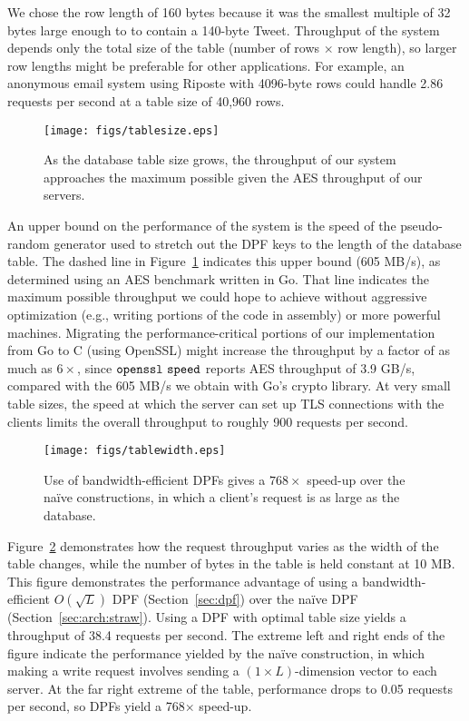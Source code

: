 \documentclass[10pt,twocolumn]{article}
\newcommand{\name}{Riposte\xspace}
\begin{document}
We chose the row length of 160 bytes because it was the smallest
multiple of 32 bytes large enough to to contain a 140-byte Tweet.
Throughput of the system depends only the total
size of the table (number of rows $\times$ row length), so larger
row lengths might be preferable for other applications.
For example, an anonymous email system using \name with 
4096-byte rows could handle 2.86 requests per second at a table
size of 40,960 rows.

\begin{figure}
\centering
\texttt{[image: figs/tablesize.eps]}
\caption{As the database table size grows, the throughput of
  our system approaches the maximum possible given the 
  AES throughput of our servers.}
\label{fig:tablesize}
\end{figure}

An upper bound on the performance of the system is the speed 
of the pseudo-random generator used to stretch out the
DPF keys to the length of the database table.
The dashed line in Figure~\ref{fig:tablesize} indicates this upper
bound (605 MB/s), as determined using an AES benchmark written in Go.
That line indicates the maximum possible throughput we could hope
to achieve without aggressive optimization (e.g., writing portions of
the code in assembly) or more powerful machines.
Migrating the performance-critical
portions of our implementation from Go to C (using OpenSSL)
might increase the throughput by a factor of as much as
$6\times$, since ${\tt openssl\ speed}$ reports AES throughput of 3.9 GB/s,
compared with the 605 MB/s we obtain with Go's crypto library.
At very small table sizes, the speed at which the server can set up
TLS connections with the clients limits the overall throughput
to roughly 900 requests per second.

\begin{figure}
\centering
\texttt{[image: figs/tablewidth.eps]}
\caption{Use of bandwidth-efficient DPFs gives 
 a $768\times$ speed-up over the na\"ive constructions,
 in which a client's request is as large as the database.}
\label{fig:tablewidth}
\end{figure}

Figure~\ref{fig:tablewidth} demonstrates how the request throughput
varies as the width of the table changes, while the number
of bytes in the table is held constant at 10 MB.
This figure demonstrates the performance advantage of using
a bandwidth-efficient $O(\sqrt{L})$ DPF (Section~\ref{sec:dpf})
over the na\"ive DPF (Section~\ref{sec:arch:straw}).
Using a DPF with optimal table size yields a throughput of 38.4 requests
per second.
The extreme left and right ends of the figure indicate the performance
yielded by the na\"ive construction, in which making a write request
involves sending a $(1 \times L)$-dimension vector to each server.
At the far right extreme of the table, performance drops to 
0.05 requests per second, so DPFs yield a 768$\times$ speed-up.
\end{document}
